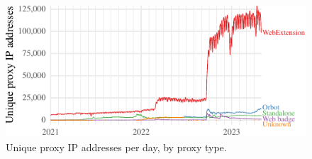 \documentclass[letterpaper,twocolumn]{article}
\begin{document}
\begin{figure}
\includegraphics{figures/proxies/proxy-type}
\caption{
Unique proxy IP addresses per day,
by proxy type.
}
\label{fig:proxy-type}
\end{figure}
\end{document}
